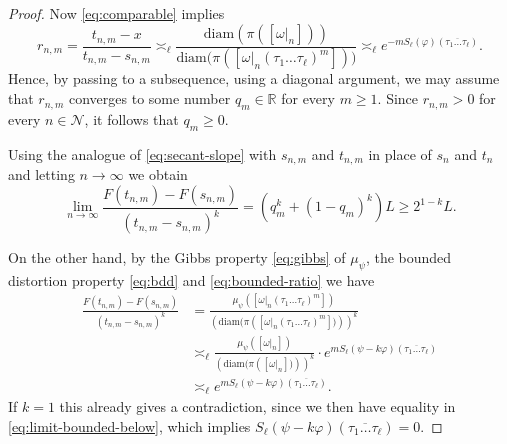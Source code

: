 \documentclass[10pt,a4paper]{amsart}
\newcommand\diam{\mathrm{diam}}
\begin{document}
\begin{proof}
Now \eqref{eq:comparable} implies 
\begin{equation}
\label{eq:rn-bdd}
r_{n,m}=\frac{t_{n,m}-x}{t_{n,m}-s_{n,m}}\asymp_\ell\frac{\diam\left(\pi\left(\left[\omega|_{n}\right]\right)\right)}{\diam\big(\pi\left(\left[\omega|_{n}(\tau_{1}\dots \tau_{\ell})^{m}\right]\right)\big)}\asymp_\ell e^{-mS_{\ell}\left(\varphi\right)(\overline{\tau_{1}\dots \tau_{\ell}})}.
\end{equation}
Hence, by passing to a subsequence, using a diagonal argument, we may assume that $r_{n,m}$ converges to some number $q_m \in \mathbb{R}$ for every $m\ge 1$.  {Since $r_{n,m}>0$ for every $n\in\mathcal{N}$, it follows that $q_m\geq 0$.}

Using {the analogue of \eqref{eq:secant-slope} with $s_{n,m}$ and $t_{n,m}$ in place of $s_n$ and $t_n$} and letting $n\rightarrow \infty$ we obtain 
\begin{equation} \label{eq:limit-bounded-below}
\lim_{n\to\infty}\frac{F(t_{n,m})-F(s_{n,m})}{(t_{n,m}-s_{n,m})^k} =\left(q_{m}^k+(1-q_{m})^k\right)L \ge 2^{1-k}L.
\end{equation}

On the other hand, by the Gibbs property \eqref{eq:gibbs} of $\mu_\psi$, the bounded distortion property \eqref{eq:bdd} and \eqref{eq:bounded-ratio} we have  
\begin{align*}
\frac{F(t_{n,m})-F(s_{n,m})}{(t_{n,m}-s_{n,m})^k} & =\frac{\mu_\psi\left(\left[\omega|_{n}(\tau_{1}\dots \tau_{\ell})^{m}\right]\right)}{\left(\diam(\pi\left(\left[\omega|_{n}(\tau_{1}\dots \tau_{\ell})^{m}\right])\right)\right)^k}\\
 & \asymp_\ell\frac{\mu_\psi\left(\left[\omega|_{n}\right]\right)}{\left(\diam(\pi\left(\left[\omega|_{n}\right])\right)\right)^k}\cdot e^{mS_{\ell}\left(\psi-k\varphi\right)(\overline{\tau_{1}\dots \tau_{\ell}})}\\
 & \asymp_\ell e^{mS_{\ell}\left(\psi-k\varphi\right)(\overline{\tau_{1}\dots \tau_{\ell}})}.
\end{align*}
If $k=1$ this already gives a contradiction, since we then have equality in \eqref{eq:limit-bounded-below}, which implies $S_{\ell}\left(\psi-k\varphi\right)(\overline{\tau_{1}\dots \tau_{\ell}})=0$.


\end{proof}
\end{document}
